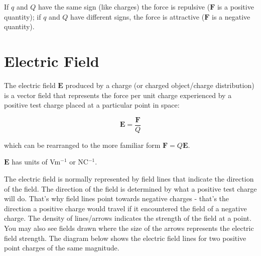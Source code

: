 \documentclass[
  letterpaper,
  DIV=11,
  numbers=noendperiod]{scrreprt}
\begin{document}
If \(q\) and \(Q\) have the same sign (like charges) the force is
repulsive (\(\mathrm{\mathbf{F}}\) is a positive quantity); if \(q\) and
\(Q\) have different signs, the force is attractive
(\(\mathrm{\mathbf{F}}\) is a negative quantity).

\section{Electric Field}\label{electric-field}

The electric field \(\mathrm{\mathbf{E}}\) produced by a charge (or
charged object/charge distribution) is a vector field that represents
the force per unit charge experienced by a positive test charge placed
at a particular point in space:

\[ \mathrm{\mathbf{E}}= \frac{\mathrm{\mathbf{F}}}{Q} \]

\noindent which can be rearranged to the more familiar form
\(\mathrm{\mathbf{F}}= Q \mathrm{\mathbf{E}}\).

\(\mathbf{E}\) has units of Vm\(^{-1}\) or NC\(^{-1}\).

The electric field is normally represented by field lines that indicate
the direction of the field. The direction of the field is determined by
what a positive test charge will do. That's why field lines point
towards negative charges - that's the direction a positive charge would
travel if it encountered the field of a negative charge. The density of
lines/arrows indicates the strength of the field at a point. You may
also see fields drawn where the size of the arrows represents the
electric field strength. The diagram below shows the electric field
lines for two positive point charges of the same magnitude.
\end{document}
